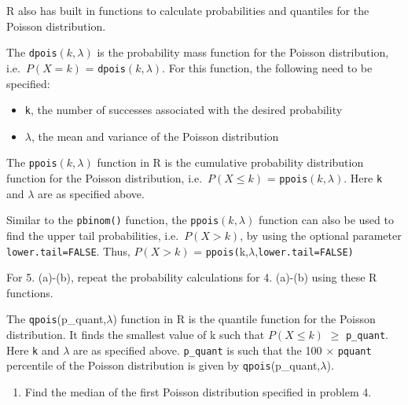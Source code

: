 \documentclass[]{article}
\providecommand{\tightlist}{%
  \setlength{\itemsep}{0pt}\setlength{\parskip}{0pt}}
\begin{document}
R also has built in functions to calculate probabilities and quantiles
for the Poisson distribution.

The \texttt{dpois}\((k,\lambda)\) is the probability mass function for
the Poisson distribution, i.e.~\(P(X=k)\) =
\texttt{dpois}\((k,\lambda)\). For this function, the following need to
be specified:

\begin{itemize}
\item
  \texttt{k}, the number of successes associated with the desired
  probability
\item
  \(\lambda\), the mean and variance of the Poisson distribution
\end{itemize}

The \texttt{ppois}\((k,\lambda)\) function in R is the cumulative
probability distribution function for the Poisson distribution,
i.e.~\(P(X \le k)\) = \texttt{ppois}\((k,\lambda)\). Here \texttt{k} and
\(\lambda\) are as specified above.

Similar to the \texttt{pbinom()} function, the
\texttt{ppois}\((k,\lambda)\) function can also be used to find the
upper tail probabilities, i.e.~\(P(X>k)\), by using the optional
parameter \texttt{lower.tail=FALSE}. Thus, \(P(X>k)\) =
\texttt{ppois(}k,\(\lambda\),\texttt{lower.tail=FALSE)}

For 5. (a)-(b), repeat the probability calculations for 4. (a)-(b) using
these R functions.

The \texttt{qpois}(p\_quant,\(\lambda\)) function in R is the quantile
function for the Poisson distribution. It finds the smallest value of k
such that \(P(X \le k)\) \(\ge\) \texttt{p\_quant}. Here \texttt{k} and
\(\lambda\) are as specified above. \texttt{p\_quant} is such that the
100 \(\times\) \texttt{pquant} percentile of the Poisson distribution is
given by \texttt{qpois}(p\_quant,\(\lambda\)).

\begin{enumerate}
\def\labelenumi{\alph{enumi})}
\setcounter{enumi}{2}
\tightlist
\item
  Find the median of the first Poisson distribution specified in problem
  4.
\end{enumerate}
\end{document}
